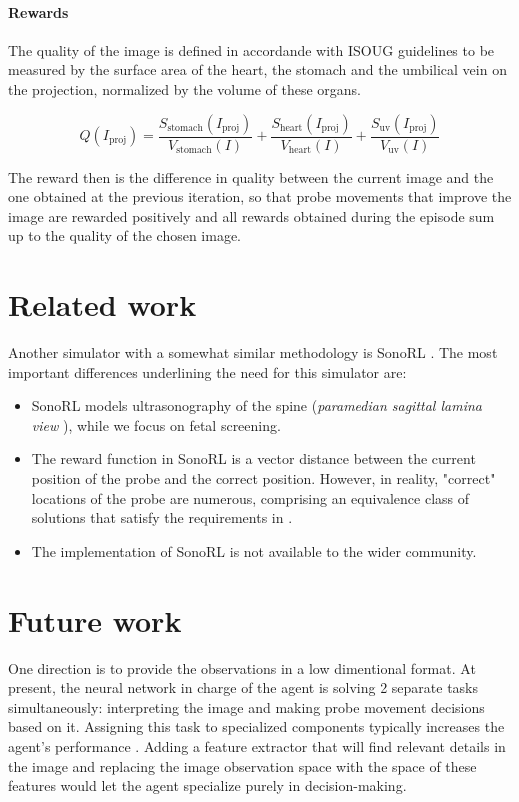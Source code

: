 \paragraph{Rewards}

The quality of the image is defined in accordande with ISOUG guidelines \cite{isoug-guidelines} to be measured by the surface area of the heart, the stomach and the umbilical vein on the projection, normalized by the volume of these organs.

\begin{equation}
    Q(I_\text{proj}) = \frac{S_\text{stomach}(I_\text{proj})}{V_\text{stomach}(I)} + \frac{S_\text{heart}(I_\text{proj})}{V_\text{heart}(I)} + \frac{S_\text{uv}(I_\text{proj})}{V_\text{uv}(I)}
\end{equation}

The reward then is the difference in quality between the current image and the one obtained at the previous iteration, so that probe movements that improve the image are rewarded positively and all rewards obtained during the episode sum up to the quality of the chosen image.

\newpage
\section{Related work}

Another simulator with a somewhat similar methodology is SonoRL \cite{sonorl}. The most important differences underlining the need for this simulator are:
\begin{itemize}
    \item SonoRL models ultrasonography of the spine (\emph{paramedian sagittal lamina view} \cite{spinal-guidelines}), while we focus on fetal screening.
    \item The reward function in SonoRL is a vector distance between the current position of the probe and the correct position. However, in reality, "correct" locations of the probe are numerous, comprising an equivalence class of solutions that satisfy the requirements in \cite{isoug-guidelines}.
    \item The implementation of SonoRL is not available to the wider community.
\end{itemize}

\newpage
\section{Future work}

One direction is to provide the observations in a low dimentional format.
At present, the neural network in charge of the agent is solving 2 separate tasks simultaneously: interpreting the image and making probe movement decisions based on it. Assigning this task to specialized components typically increases the agent's performance \cite{decoupling-rl}. Adding a feature extractor that will find relevant details in the image and replacing the image observation space with the space of these features would let the agent specialize purely in decision-making.

